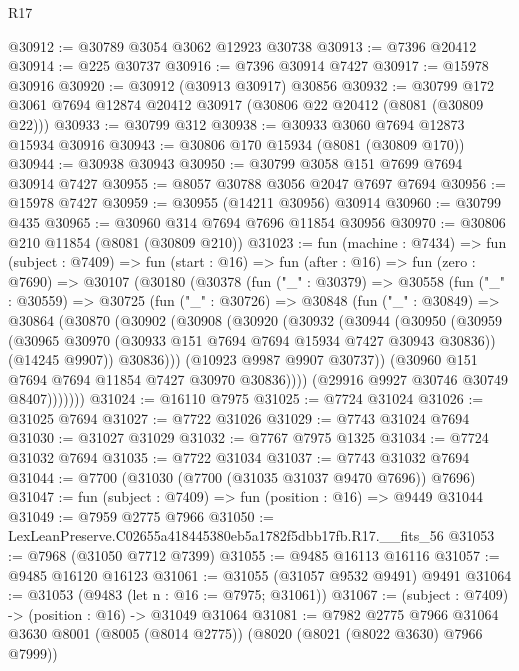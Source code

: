 \begin{lexlean}{R17}
\begin{coremodule}
@30912 := @30789 @3054 @3062 @12923 @30738
@30913 := @7396 @20412
@30914 := @225 @30737
@30916 := @7396 @30914 @7427
@30917 := @15978 @30916
@30920 := @30912 (@30913 @30917) @30856
@30932 := @30799 @172 @3061 @7694 @12874 @20412 @30917 (@30806 @22 @20412 (@8081 (@30809 @22)))
@30933 := @30799 @312
@30938 := @30933 @3060 @7694 @12873 @15934 @30916
@30943 := @30806 @170 @15934 (@8081 (@30809 @170))
@30944 := @30938 @30943
@30950 := @30799 @3058 @151 @7699 @7694 @30914 @7427
@30955 := @8057 @30788 @3056 @2047 @7697 @7694
@30956 := @15978 @7427
@30959 := @30955 (@14211 @30956) @30914
@30960 := @30799 @435
@30965 := @30960 @314 @7694 @7696 @11854 @30956
@30970 := @30806 @210 @11854 (@8081 (@30809 @210))
@31023 := fun (machine : @7434) =>
  fun (subject : @7409) =>
  fun (start : @16) =>
  fun (after : @16) =>
  fun (zero : @7690) =>
  @30107
    (@30180
      (@30378
        (fun ("_" : @30379) =>
        @30558
          (fun ("_" : @30559) =>
          @30725
            (fun ("_" : @30726) =>
            @30848
              (fun ("_" : @30849) =>
              @30864
                (@30870
                  (@30902
                    (@30908
                      (@30920
                        (@30932
                          (@30944
                            (@30950
                              (@30959
                                (@30965 @30970 (@30933 @151 @7694 @7694 @15934 @7427 @30943 @30836))
                                (@14245 @9907))
                              @30836)))
                        (@10923 @9987 @9907 @30737))
                      (@30960 @151 @7694 @7694 @11854 @7427 @30970 @30836))))
                (@29916 @9927 @30746 @30749 @8407)))))))
@31024 := @16110 @7975
@31025 := @7724 @31024
@31026 := @31025 @7694
@31027 := @7722 @31026
@31029 := @7743 @31024 @7694
@31030 := @31027 @31029
@31032 := @7767 @7975 @1325
@31034 := @7724 @31032 @7694
@31035 := @7722 @31034
@31037 := @7743 @31032 @7694
@31044 := @7700 (@31030 (@7700 (@31035 @31037 @9470 @7696)) @7696)
@31047 := fun (subject : @7409) => fun (position : @16) => @9449 @31044
@31049 := @7959 @2775 @7966
@31050 := LexLeanPreserve.C02655a418445380eb5a1782f5dbb17fb.R17.__fits_56
@31053 := @7968 (@31050 @7712 @7399)
@31055 := @9485 @16113 @16116
@31057 := @9485 @16120 @16123
@31061 := @31055 (@31057 @9532 @9491) @9491
@31064 := @31053 (@9483 (let n : @16 := @7975; @31061))
@31067 := (subject : @7409) -> (position : @16) -> @31049 @31064
@31081 := @7982
    @2775
    @7966
    @31064
    @3630
    @8001
    (@8005 (@8014 @2775))
    (@8020 (@8021 (@8022 @3630) @7966 @7999))

\end{coremodule}
\end{lexlean}
